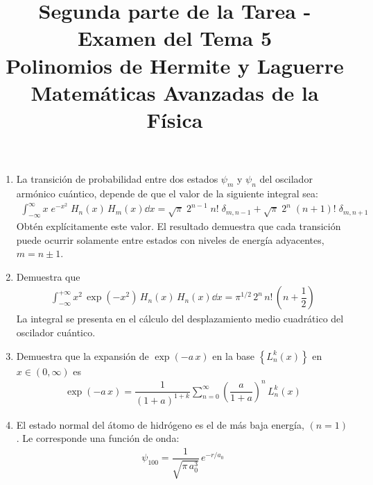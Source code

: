 
\author{}
\title{Segunda parte de la Tarea - Examen del Tema 5  \\ \large{Polinomios de Hermite y Laguerre \\ Matemáticas Avanzadas de la Física}} \vspace{-1.5\baselineskip}
\date{ }

\vspace{-4cm}
\renewcommand\labelenumii{\theenumi.{\arabic{enumii})}}
\maketitle
\fontsize{14}{14}\selectfont
\begin{enumerate}
\item La transición de probabilidad entre dos estados $\psi_{m}$ y $\psi_{n}$ del oscilador armónico cuántico, depende de que el valor de la siguiente integral sea:
\begin{align*}
\int_{-\infty}^{\infty} x \; e^{-x^{2}} \; H_{n} (x) \, H_{m}(x) \dd{x} = \sqrt{\pi} \; 2^{n-1} \; n! \; \delta_{m,n-1} + \sqrt{\pi} \; 2^{n} \; (n+1)! \; \delta_{m,n+1}
\end{align*}
Obtén explícitamente este valor. El resultado demuestra que cada transición puede ocurrir solamente entre estados con niveles de energía adyacentes, $m = n \pm 1$.
\item Demuestra que
\begin{align*}
\int_{-\infty}^{+\infty} x^{2} \, \exp \left( -x^{2} \right) \, H_{n} (x) \, H_{n} (x) \dd{x} = \pi^{1/2} \, 2^{n} \, n! \, \left( n + \dfrac{1}{2} \right)
\end{align*}
La integral se presenta en el cálculo del desplazamiento medio cuadrático del oscilador cuántico.
\item Demuestra que la expansión de $\exp(-a \, x)$ en la base $\left\{ L_{n}^{k} (x) \right\}$ en $ x \in (0, \infty)$ es
\begin{align*}
\exp(-a \, x) = \dfrac{1}{(1 + a)^{1+k}} \sum_{n=0}^{\infty} \left( \dfrac{a}{1 + a} \right)^{n} \, L_{n}^{k} (x)
\end{align*}
\item El estado normal del átomo de hidrógeno es el de más baja energía, $(n = 1)$. Le corresponde una función de onda:
\begin{align*}
\psi_{100} = \dfrac{1}{\sqrt{\pi \, a_{0}^{3}}} \, e^{-r/a_{0}}\end{align*}

\end{enumerate}
